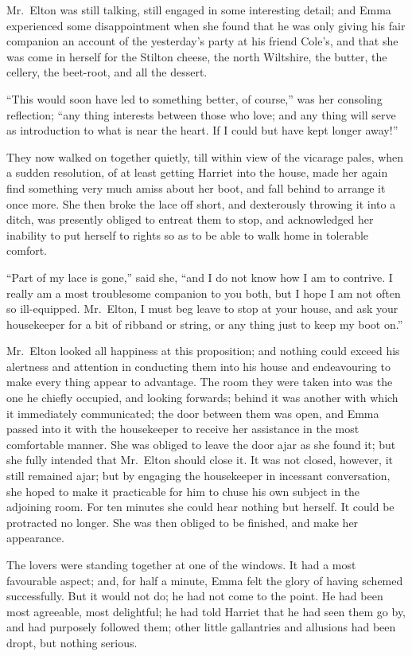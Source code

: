Mr.\ Elton was still talking, still engaged in some interesting detail;
and Emma experienced some disappointment when she found that he
was only giving his fair companion an account of the yesterday's
party at his friend Cole's, and that she was come in herself for
the Stilton cheese, the north Wiltshire, the butter, the cellery,
the beet-root, and all the dessert.

``This would soon have led to something better, of course,'' was her
consoling reflection; ``any thing interests between those who love;
and any thing will serve as introduction to what is near the heart.
If I could but have kept longer away!''

They now walked on together quietly, till within view of the vicarage
pales, when a sudden resolution, of at least getting Harriet into
the house, made her again find something very much amiss about her boot,
and fall behind to arrange it once more.  She then broke the lace
off short, and dexterously throwing it into a ditch, was presently
obliged to entreat them to stop, and acknowledged her inability to
put herself to rights so as to be able to walk home in tolerable comfort.

``Part of my lace is gone,'' said she, ``and I do not know how I am
to contrive.  I really am a most troublesome companion to you both,
but I hope I am not often so ill-equipped. Mr.\ Elton, I must beg
leave to stop at your house, and ask your housekeeper for a bit
of ribband or string, or any thing just to keep my boot on.''

Mr.\ Elton looked all happiness at this proposition; and nothing
could exceed his alertness and attention in conducting them into
his house and endeavouring to make every thing appear to advantage.
The room they were taken into was the one he chiefly occupied,
and looking forwards; behind it was another with which it immediately
communicated; the door between them was open, and Emma passed
into it with the housekeeper to receive her assistance in the most
comfortable manner.  She was obliged to leave the door ajar as she
found it; but she fully intended that Mr.\ Elton should close it.
It was not closed, however, it still remained ajar; but by engaging
the housekeeper in incessant conversation, she hoped to make it
practicable for him to chuse his own subject in the adjoining room.
For ten minutes she could hear nothing but herself.  It could
be protracted no longer.  She was then obliged to be finished,
and make her appearance.

The lovers were standing together at one of the windows.  It had a
most favourable aspect; and, for half a minute, Emma felt the glory
of having schemed successfully.  But it would not do; he had not
come to the point.  He had been most agreeable, most delightful;
he had told Harriet that he had seen them go by, and had purposely
followed them; other little gallantries and allusions had been dropt,
but nothing serious.

